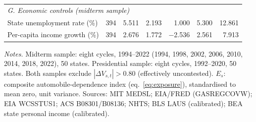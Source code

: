 \documentclass[12pt]{article}
\begin{document}
\begin{table}[!htbp]
\begin{threeparttable}
\begin{tabular}{lrrrrrr}
\multicolumn{7}{l}{\textit{G. Economic controls (midterm sample)}} \\[2pt]
State unemployment rate (\%) & 394 & 5.511 & 2.193 & 1.000 & 5.300 & 12.861 \\
Per-capita income growth (\%) & 394 & 2.676 & 1.772 & $-$2.536 & 2.561 & 7.913 \\
\bottomrule
\end{tabular}
\begin{tablenotes}
\footnotesize
\item \textit{Notes.} Midterm sample: eight cycles, 1994--2022 (1994, 1998, 2002, 2006, 2010, 2014, 2018, 2022), 50 states. Presidential sample: eight cycles, 1992--2020, 50 states. Both samples exclude $|\Delta V_{s,t}|>0.80$ (effectively uncontested). $E_s$: composite automobile-dependence index (eq.~\ref{eq:exposure}), standardised to mean zero, unit variance. Sources: MIT MEDSL; EIA/FRED (GASREGCOVW); EIA WCSSTUS1; ACS B08301/B08136; NHTS; BLS LAUS (calibrated); BEA state personal income (calibrated).
\end{tablenotes}
\end{threeparttable}
\end{table}
\end{document}

